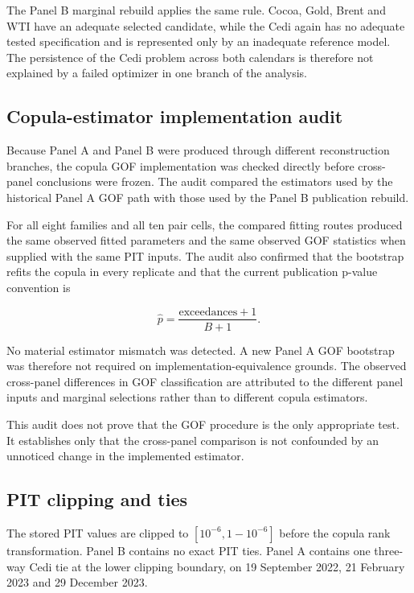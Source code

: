 The Panel B marginal rebuild applies the same rule. Cocoa, Gold, Brent and WTI have an adequate selected candidate, while the Cedi again has no adequate tested specification and is represented only by an inadequate reference model. The persistence of the Cedi problem across both calendars is therefore not explained by a failed optimizer in one branch of the analysis.

\subsection{Copula-estimator implementation audit}

Because Panel A and Panel B were produced through different reconstruction branches, the copula GOF implementation was checked directly before cross-panel conclusions were frozen. The audit compared the estimators used by the historical Panel A GOF path with those used by the Panel B publication rebuild.

For all eight families and all ten pair cells, the compared fitting routes produced the same observed fitted parameters and the same observed GOF statistics when supplied with the same PIT inputs. The audit also confirmed that the bootstrap refits the copula in every replicate and that the current publication p-value convention is

\[
\hat p=\frac{\text{exceedances}+1}{B+1}.
\]

No material estimator mismatch was detected. A new Panel A GOF bootstrap was therefore not required on implementation-equivalence grounds. The observed cross-panel differences in GOF classification are attributed to the different panel inputs and marginal selections rather than to different copula estimators.

This audit does not prove that the GOF procedure is the only appropriate test. It establishes only that the cross-panel comparison is not confounded by an unnoticed change in the implemented estimator.

\subsection{PIT clipping and ties}

The stored PIT values are clipped to \([10^{-6},1-10^{-6}]\) before the copula rank transformation. Panel B contains no exact PIT ties. Panel A contains one three-way Cedi tie at the lower clipping boundary, on 19 September 2022, 21 February 2023 and 29 December 2023.

